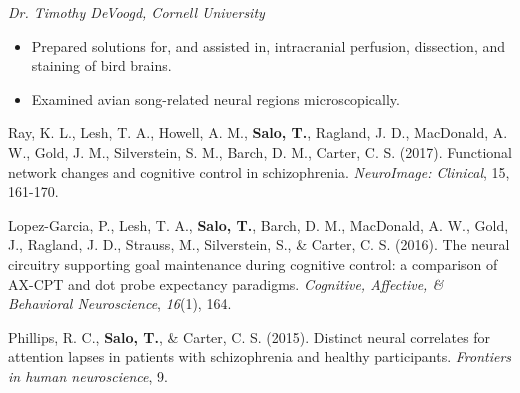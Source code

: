 \documentclass[10pt]{article}
\newcommand{\sectionstyle}{\LARGE \fontfamily{pcr}\selectfont}
\begin{document}
\emph{Dr. Timothy DeVoogd, Cornell University}

\begin{itemize}[noitemsep, nolistsep]
\item
  Prepared solutions for, and assisted in, intracranial perfusion,
  dissection, and staining of bird brains.
\item
  Examined avian song-related neural regions microscopically.
\end{itemize}

\newpage

\begin{center}\sectionstyle{PUBLICATIONS}\end{center}

\begin{hangparas}{.25in}{1}
Ray, K. L., Lesh, T. A., Howell, A. M., \textbf{Salo, T.}, Ragland, J. D., MacDonald, A. W., Gold, J. M., Silverstein, S. M., Barch, D. M., Carter, C. S. (2017). Functional network changes and cognitive control in schizophrenia. \emph{NeuroImage: Clinical}, 15, 161-170.

\bigskip

Lopez-Garcia, P., Lesh, T. A., \textbf{Salo, T.}, Barch, D. M., MacDonald, A. W., Gold, J., Ragland, J. D., Strauss, M., Silverstein, S., \& Carter, C. S. (2016). The neural circuitry supporting goal maintenance during cognitive control: a comparison of AX-CPT and dot probe expectancy paradigms. \emph{Cognitive, Affective, \& Behavioral Neuroscience}, \emph{16}(1), 164.

\bigskip

Phillips, R. C., \textbf{Salo, T.}, \& Carter, C. S. (2015). Distinct neural correlates for attention lapses in patients with schizophrenia and healthy participants. \emph{Frontiers in human neuroscience}, 9.
\end{hangparas}

\bigskip

\begin{center}\sectionstyle{PRESENTATIONS}\end{center}
\end{document}
